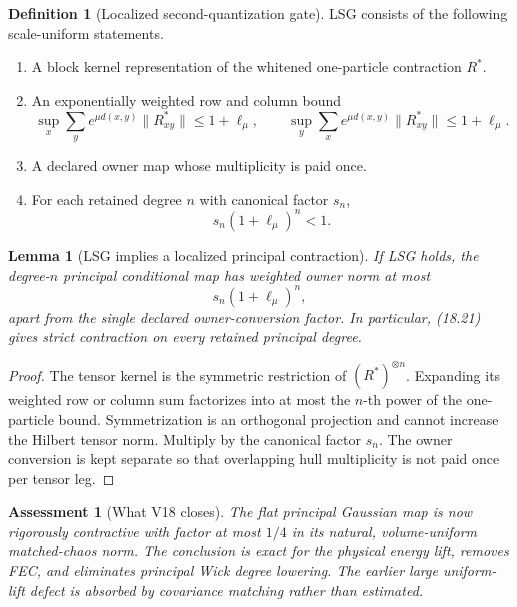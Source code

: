 \documentclass[11pt,oneside]{book}
\newtheorem{lemma}[theorem]{Lemma}
\newtheorem{assessment}[theorem]{Assessment}
\theoremstyle{definition}
\newtheorem{definition}[theorem]{Definition}
\theoremstyle{remark}
\begin{document}
\begin{definition}[Localized second-quantization gate]
\label{def:e8v18-lsg}
LSG consists of the following scale-uniform statements.
\begin{enumerate}
\item A block kernel representation of the whitened one-particle
contraction \(R^*\).
\item An exponentially weighted row and column bound
\[
 \sup_x\sum_y e^{\mu d(x,y)}\|R^*_{xy}\|\leq1+\ell_\mu,\qquad
 \sup_y\sum_x e^{\mu d(x,y)}\|R^*_{xy}\|\leq1+\ell_\mu.             \tag{18.20}
\]
\item A declared owner map whose multiplicity is paid once.
\item For each retained degree \(n\) with canonical factor \(s_n\),
\[
                         s_n(1+\ell_\mu)^n<1.                       \tag{18.21}
\]
\end{enumerate}
\end{definition}

\begin{lemma}[LSG implies a localized principal contraction]
\label{lem:e8v18-lsg}
If LSG holds, the degree-\(n\) principal conditional map has weighted
owner norm at most
\[
                         s_n(1+\ell_\mu)^n,                         \tag{18.22}
\]
apart from the single declared owner-conversion factor.  In
particular, (18.21) gives strict contraction on every retained
principal degree.
\end{lemma}

\begin{proof}
The tensor kernel is the symmetric restriction of
\((R^*)^{\otimes n}\).  Expanding its weighted row or column sum
factorizes into at most the \(n\)-th power of the one-particle bound.
Symmetrization is an orthogonal projection and cannot increase the
Hilbert tensor norm.  Multiply by the canonical factor \(s_n\).
The owner conversion is kept separate so that overlapping hull
multiplicity is not paid once per tensor leg.
\end{proof}

\begin{assessment}[What V18 closes]
\label{ass:e8v18-closes}
The flat principal Gaussian map is now rigorously contractive with
factor at most \(1/4\) in its natural, volume-uniform matched-chaos
norm.  The conclusion is exact for the physical energy lift, removes
FEC, and eliminates principal Wick degree lowering.  The earlier
large uniform-lift defect is absorbed by covariance matching rather
than estimated.
\end{assessment}
\end{document}
